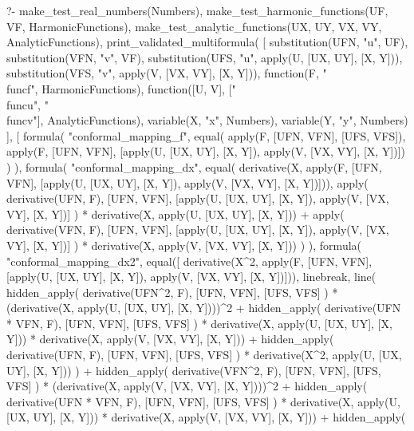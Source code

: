 \begin{prolog}
?-	make_test_real_numbers(Numbers),
	make_test_harmonic_functions(UF, VF, HarmonicFunctions),
	make_test_analytic_functions(UX, UY, VX, VY, AnalyticFunctions),
	print_validated_multiformula(
		[
			substitution(UFN, "u", UF),   %
			substitution(VFN, "v", VF),   %
			substitution(UFS, "u", apply(U, [UX, UY], [X, Y])),   %
			substitution(VFS, "v", apply(V, [VX, VY], [X, Y])),   %
			function(F, "\\func{f}", HarmonicFunctions),
			function([U, V], ["\\func{u}", "\\func{v}"], AnalyticFunctions),
			variable(X, "x", Numbers),
			variable(Y, "y", Numbers)
		],
		[
			formula(
				"conformal_mapping_f",
				equal(
					apply(F, [UFN, VFN], [UFS, VFS]),
					apply(F, [UFN, VFN], [apply(U, [UX, UY], [X, Y]), apply(V, [VX, VY], [X, Y])])
				)
			),
			formula(
				"conformal_mapping_dx",
				equal(
					derivative(X, apply(F, [UFN, VFN], [apply(U, [UX, UY], [X, Y]), apply(V, [VX, VY], [X, Y])])),
					apply(
						derivative(UFN, F),
						[UFN, VFN], [apply(U, [UX, UY], [X, Y]), apply(V, [VX, VY], [X, Y])]
					) * derivative(X, apply(U, [UX, UY], [X, Y])) +
					apply(
						derivative(VFN, F),
						[UFN, VFN], [apply(U, [UX, UY], [X, Y]), apply(V, [VX, VY], [X, Y])]
					) * derivative(X, apply(V, [VX, VY], [X, Y]))
				)
			),
			formula(
				"conformal_mapping_dx2",
				equal([
					derivative(X^2, apply(F, [UFN, VFN], [apply(U, [UX, UY], [X, Y]), apply(V, [VX, VY], [X, Y])])),
					linebreak,
					line(
						hidden_apply(
							derivative(UFN^2, F),
							[UFN, VFN],
							[UFS, VFS]
						) * (derivative(X, apply(U, [UX, UY], [X, Y])))^2 +
						hidden_apply(
							derivative(UFN * VFN, F),
							[UFN, VFN],
							[UFS, VFS]
						) * derivative(X, apply(U, [UX, UY], [X, Y])) * derivative(X, apply(V, [VX, VY], [X, Y])) +
						hidden_apply(
							derivative(UFN, F),
							[UFN, VFN],
							[UFS, VFS]
						) * derivative(X^2, apply(U, [UX, UY], [X, Y]))
					) +
					hidden_apply(
						derivative(VFN^2, F),
						[UFN, VFN],
						[UFS, VFS]
					) * (derivative(X, apply(V, [VX, VY], [X, Y])))^2 +
					hidden_apply(
						derivative(UFN * VFN, F),
						[UFN, VFN],
						[UFS, VFS]
					) * derivative(X, apply(U, [UX, UY], [X, Y])) * derivative(X, apply(V, [VX, VY], [X, Y])) +
					hidden_apply(

\end{prolog}
